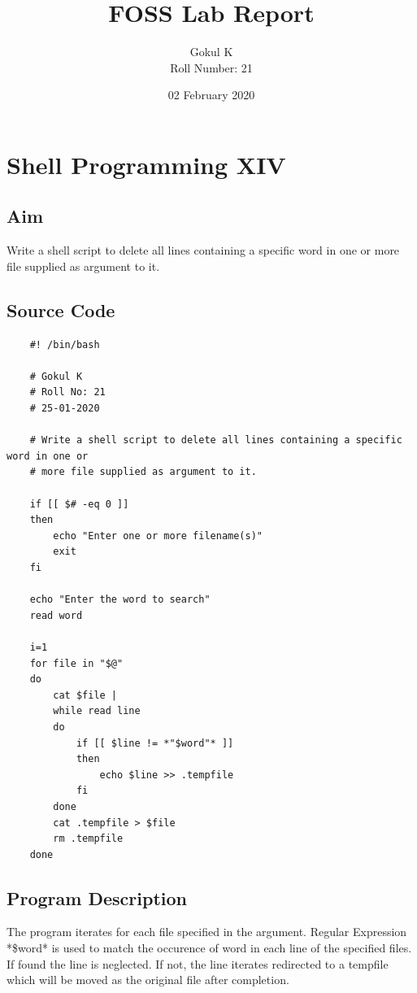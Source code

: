 \documentclass{article}
\begin{document}
\title{FOSS Lab Report}
\author{Gokul K\\[2\baselineskip]
Roll Number: 21\\[2\baselineskip]}
\date{02 February 2020}

\maketitle

\setcounter{section}{17}
\section{Shell Programming XIV}
\subsection{Aim}
Write a shell script to delete all lines containing a specific word in one or
more file supplied as argument to it.


\subsection{Source Code}
\begin{verbatim}
    #! /bin/bash

    # Gokul K
    # Roll No: 21
    # 25-01-2020

    # Write a shell script to delete all lines containing a specific word in one or
    # more file supplied as argument to it.

    if [[ $# -eq 0 ]]
    then 
        echo "Enter one or more filename(s)"
        exit
    fi

    echo "Enter the word to search"
    read word

    i=1
    for file in "$@"
    do
        cat $file |
        while read line
        do
            if [[ $line != *"$word"* ]]
            then
                echo $line >> .tempfile
            fi
        done
        cat .tempfile > $file
        rm .tempfile
    done

\end{verbatim}

\subsection{Program Description}
The program iterates for each file specified in the argument. Regular
Expression *\$word* is used to match the occurence of word in each line of
the specified files. If found the line is neglected. If not, the line iterates
redirected to a tempfile which will be moved as the original file after completion.
\end{document}
